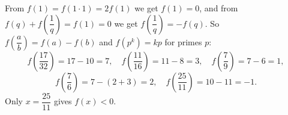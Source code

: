 From $f(1)=f(1\cdot1)=2f(1)$ we get $f(1)=0$, and from $f(q)+f\!\left(\dfrac1q\right)=f(1)=0$ we get $f\!\left(\dfrac1q\right)=-f(q)$. So $f\!\left(\dfrac ab\right)=f(a)-f(b)$ and $f(p^k)=kp$ for primes $p$:
\[f\!\left(\dfrac{17}{32}\right)=17-10=7,\quad f\!\left(\dfrac{11}{16}\right)=11-8=3,\quad f\!\left(\dfrac79\right)=7-6=1,\]
\[f\!\left(\dfrac76\right)=7-(2+3)=2,\quad f\!\left(\dfrac{25}{11}\right)=10-11=-1.\]
Only $\boxed{x=\dfrac{25}{11}}$ gives $f(x)<0$.
